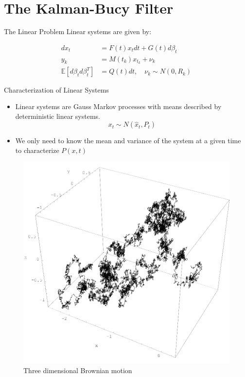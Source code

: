 \documentclass{beamer}
\begin{document}
\section{The Kalman-Bucy Filter}

\begin{frame}{The Linear Problem}
  Linear systems are given by:

  \pause
    \begin{align}
      dx_t &= F(t) x_t dt + G(t) d\beta_t \\
      y_k &= M(t_k) x_{t_k} + \nu_k \\
      \mathbb{E}[d\beta_td\beta_t^T] &= Q(t) dt, \quad \nu_k \sim N(0,R_k)
    \end{align}
   \pause
 
\end{frame}

\begin{frame}{Characterization of Linear Systems}
  \begin{itemize}
   \pause
  \item Linear systems are Gauss Markov processes with means described by
    deterministic linear systems.
    \begin{equation}
      x_t \sim N(\hat{x}_t,P_t)
    \end{equation}
   \pause
  \item We only need to know the mean and variance of the system at a given time
    to characterize $P(x,t)$
  \end{itemize}
  \pause
  \begin{figure}
    \includegraphics[scale=0.12]{Wiener_process_3d.png}
    \caption{Three dimensional Brownian motion}
  \end{figure}
\end{frame}
\end{document}
